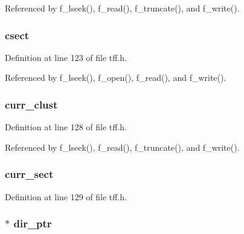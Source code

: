 Referenced by f\-\_\-lseek(), f\-\_\-read(), f\-\_\-truncate(), and f\-\_\-write().

\hypertarget{struct_f_i_l_ae338a94c0232319659d442df5676325d}{
\subsubsection[{csect}]{ csect}}\label{struct_f_i_l_ae338a94c0232319659d442df5676325d}


Definition at line 123 of file tff.\-h.



Referenced by f\-\_\-lseek(), f\-\_\-open(), f\-\_\-read(), and f\-\_\-write().

\hypertarget{struct_f_i_l_a32da77ccc2ccbe19278c7889417fb9a3}{
\subsubsection[{curr\-\_\-clust}]{ curr\-\_\-clust}}\label{struct_f_i_l_a32da77ccc2ccbe19278c7889417fb9a3}


Definition at line 128 of file tff.\-h.



Referenced by f\-\_\-lseek(), f\-\_\-read(), f\-\_\-truncate(), and f\-\_\-write().

\hypertarget{struct_f_i_l_a36b8981ac0c7cca7ef120e739f29a3e1}{
\subsubsection[{curr\-\_\-sect}]{ curr\-\_\-sect}}\label{struct_f_i_l_a36b8981ac0c7cca7ef120e739f29a3e1}


Definition at line 129 of file tff.\-h.

\hypertarget{struct_f_i_l_afacf116ecd9d7cc2d242027ecd4d7cb5}{
\subsubsection[{dir\-\_\-ptr}]{$\ast$ dir\-\_\-ptr}}\label{struct_f_i_l_afacf116ecd9d7cc2d242027ecd4d7cb5}


